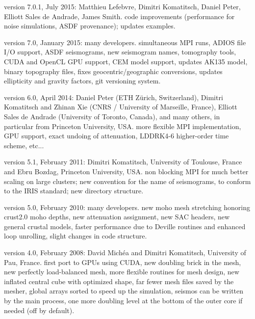  version 7.0.1, July 2015:
   Matthieu Lefebvre, Dimitri Komatitsch, Daniel Peter, Elliott Sales de Andrade, James Smith.
     code improvements (performance for noise simulations, ASDF provenance); updates examples.\newline

 version 7.0, January 2015:
   many developers.
     simultaneous MPI runs, ADIOS file I/O support, ASDF seismograms, new seismogram names, tomography tools,
     CUDA and OpenCL GPU support, CEM model support, updates AK135 model, binary topography files,
     fixes geocentric/geographic conversions, updates ellipticity and gravity factors, git versioning system.\newline

 version 6.0, April 2014:
   Daniel Peter (ETH Z\"urich, Switzerland), Dimitri Komatitsch and Zhinan Xie (CNRS / University of Marseille, France),
   Elliott Sales de Andrade (University of Toronto, Canada), and many others, in particular from Princeton University, USA.
     more flexible MPI implementation, GPU support, exact undoing of attenuation, LDDRK4-6 higher-order time scheme, etc...\newline

 version 5.1, February 2011:
   Dimitri Komatitsch, University of Toulouse, France and Ebru Bozdag, Princeton University, USA.
     non blocking MPI for much better scaling on large clusters;
     new convention for the name of seismograms, to conform to the IRIS standard;
     new directory structure.\newline

 version 5.0, February 2010:
   many developers.
     new moho mesh stretching honoring crust2.0 moho depths,
     new attenuation assignment, new SAC headers, new general crustal models,
     faster performance due to Deville routines and enhanced loop unrolling,
     slight changes in code structure.\newline

 version 4.0, February 2008:
   David Mich\'ea and Dimitri Komatitsch, University of Pau, France.
     first port to GPUs using CUDA, new doubling brick in the mesh, new perfectly load-balanced mesh,
     more flexible routines for mesh design, new inflated central cube
     with optimized shape, far fewer mesh files saved by the mesher,
     global arrays sorted to speed up the simulation, seismos can be
     written by the main process, one more doubling level at the bottom
     of the outer core if needed (off by default).\newline

